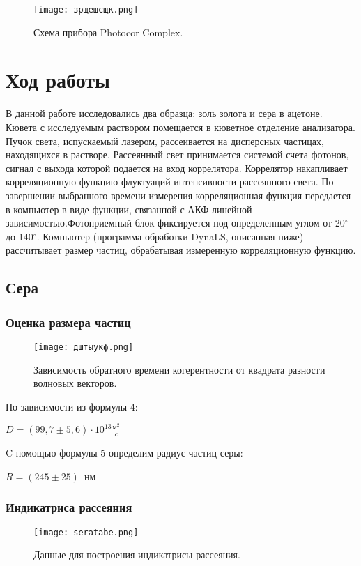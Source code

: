 \documentclass[a4paper,10pt]{article}
\begin{document}
\begin{figure}[H]
    \centering
    \texttt{[image: зрщещсщк.png]}
    \caption{Схема прибора Photocor Complex.}
    \label{fig:enter-label}
\end{figure}

\section{Ход работы}
В данной работе исследовались два образца: золь золота и сера в ацетоне. Кювета с исследуемым раствором помещается в кюветное отделение анализатора. Пучок света, испускаемый лазером, рассеивается на дисперсных частицах, находящихся в растворе. Рассеянный свет принимается системой счета фотонов, сигнал с выхода которой подается на вход коррелятора. Коррелятор накапливает корреляционную функцию
флуктуаций интенсивности рассеянного света. По завершении выбранного времени измерения корреляционная функция передается в компьютер в виде
функции, связанной с АКФ линейной зависимостью.Фотоприемный блок фиксируется под определенным углом от 20$^{\circ}$ до 140$^{\circ}$. Компьютер (программа обработки DynaLS, описанная ниже) рассчитывает размер частиц, обрабатывая измеренную корреляционную функцию.
\subsection{Сера}
\subsubsection{Оценка размера частиц}

\begin{figure}[H]
    \centering
    \texttt{[image: дштыукф.png]}
    \caption{Зависимость обратного времени когерентности от квадрата разности волновых векторов.}
    \label{fig:enter-label}
\end{figure}
По зависимости из формулы 4: 
\begin{center}
    $D = (99,7 \pm 5,6)\cdot 10^{13} \frac{\text{м}^2}{c}$ 
\end{center}
C помощью формулы 5 определим радиус частиц серы:
\begin{center}
    $R = (245\pm 25)$~нм
\end{center}

\subsubsection{Индикатриса рассеяния}
\begin{figure}[H]
    \centering
    \texttt{[image: seratabe.png]}
    \caption{Данные для построения индикатрисы рассеяния.}
    \label{fig:enter-label}
\end{figure}
\end{document}
